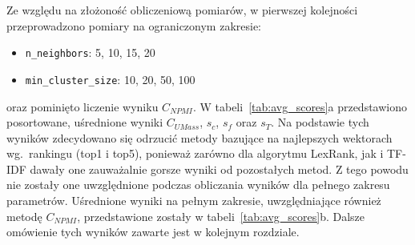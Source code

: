 	Ze względu na złożoność obliczeniową pomiarów, w pierwszej kolejności przeprowadzono pomiary na ograniczonym zakresie:
	\begin{itemize}
		\item \verb|n_neighbors|: 5, 10, 15, 20
		\item \verb|min_cluster_size|: 10, 20, 50, 100
	\end{itemize}
	oraz pominięto liczenie wyniku \(C_{NPMI}\).
	W tabeli~\ref{tab:avg_scores}a przedstawiono posortowane, uśrednione wyniki \(C_{UMass}\), \(s_c\), \(s_f\) oraz \(s_T\).
	Na podstawie tych wyników zdecydowano się odrzucić metody bazujące na najlepszych wektorach wg.\ rankingu (top1 i top5),
		ponieważ zarówno dla algorytmu LexRank, jak i TF-IDF dawały one zauważalnie gorsze wyniki od pozostałych metod.
	Z tego powodu nie zostały one uwzględnione podczas obliczania wyników dla pełnego zakresu parametrów.
	Uśrednione wyniki na pełnym zakresie, uwzględniające również metodę \(C_{NPMI}\), przedstawione zostały w tabeli~\ref{tab:avg_scores}b.
	Dalsze omówienie tych wyników zawarte jest w kolejnym rozdziale.
		
